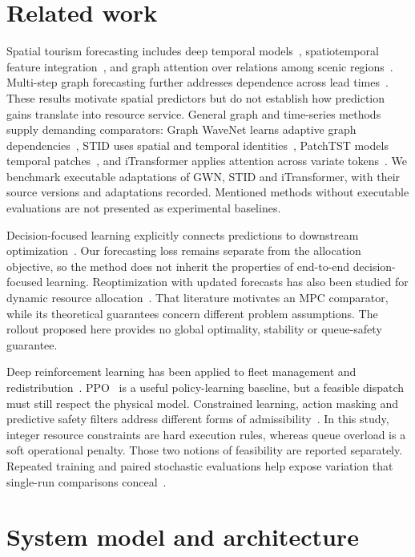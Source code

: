 \section{Related work}
Spatial tourism forecasting includes deep temporal models~\citep{law2019}, spatiotemporal feature integration~\citep{li2022}, and graph attention over relations among scenic regions~\citep{zhou2023}. Multi-step graph forecasting further addresses dependence across lead times~\citep{liang2025}. These results motivate spatial predictors but do not establish how prediction gains translate into resource service. General graph and time-series methods supply demanding comparators: Graph WaveNet learns adaptive graph dependencies~\citep{wu2019}, STID uses spatial and temporal identities~\citep{shao2022}, PatchTST models temporal patches~\citep{nie2023}, and iTransformer applies attention across variate tokens~\citep{liu2024}. We benchmark executable adaptations of GWN, STID and iTransformer, with their source versions and adaptations recorded. Mentioned methods without executable evaluations are not presented as experimental baselines.

Decision-focused learning explicitly connects predictions to downstream optimization~\citep{donti2017,elmachtoub2022,wilder2019}. Our forecasting loss remains separate from the allocation objective, so the method does not inherit the properties of end-to-end decision-focused learning. Reoptimization with updated forecasts has also been studied for dynamic resource allocation~\citep{ciocan2012}. That literature motivates an MPC comparator, while its theoretical guarantees concern different problem assumptions. The rollout proposed here provides no global optimality, stability or queue-safety guarantee.

Deep reinforcement learning has been applied to fleet management and redistribution~\citep{lin2018,pan2019}. PPO~\citep{schulman2017} is a useful policy-learning baseline, but a feasible dispatch must still respect the physical model. Constrained learning, action masking and predictive safety filters address different forms of admissibility~\citep{achiam2017,huang2022,wabersich2021}. In this study, integer resource constraints are hard execution rules, whereas queue overload is a soft operational penalty. Those two notions of feasibility are reported separately. Repeated training and paired stochastic evaluations help expose variation that single-run comparisons conceal~\citep{agarwal2021}.

\section{System model and architecture}
